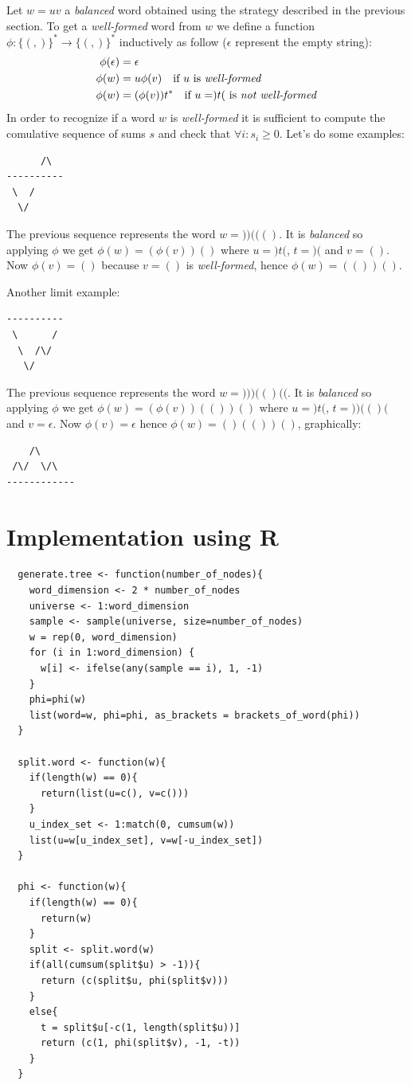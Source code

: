Let $w=uv$ a \emph{balanced} word obtained using the strategy described
in the previous section. To get a \emph{well-formed} word from $w$ we
define a function $\phi:\{(,)\}^*\rightarrow \{(,)\}^*$ inductively as
follow ($\epsilon$ represent the empty string):
\begin{displaymath}
  \begin{split}
    \phi(\epsilon) &= \epsilon \\
    \phi(w) &= u \phi(v) \quad \text{if } u \text{ is
      \emph{well-formed}}\\
    \phi(w) &= ( \phi(v) )t^* \quad \text{if } u=)t( \text{ is
      \emph{not well-formed}} 
  \end{split}
\end{displaymath}
In order to recognize if a word $w$ is \emph{well-formed} it is
sufficient to compute the comulative sequence of sums $s$ and check
that $\forall i:s_i \geq 0$. Let's do some examples:
\begin{verbatim}
      /\
----------
 \  /
  \/
\end{verbatim}
The previous sequence represents the word $w=))((()$. It is
\emph{balanced} so applying $\phi$ we get $\phi(w) = (\phi(v))()$
where $u=)t($, $t=)($ and $v=()$. Now $\phi(v) = ()$ because $v=()$ is
\emph{well-formed}, hence $\phi(w) = (())()$.

Another limit example:
\begin{verbatim}
----------
 \      /
  \  /\/
   \/
\end{verbatim}
The previous sequence represents the word $w=)))(()(($. It is
\emph{balanced} so applying $\phi$ we get $\phi(w) = (\phi(v))(())()$
where $u=)t($, $t=))(()($ and $v=\epsilon$. Now $\phi(v) =
\epsilon$ hence $\phi(w) = ()(())()$, graphically:
\begin{verbatim}
    /\
 /\/  \/\
------------
\end{verbatim}


\section{Implementation using R}

\begin{lstlisting}
  generate.tree <- function(number_of_nodes){
    word_dimension <- 2 * number_of_nodes    
    universe <- 1:word_dimension
    sample <- sample(universe, size=number_of_nodes)
    w = rep(0, word_dimension)
    for (i in 1:word_dimension) {
      w[i] <- ifelse(any(sample == i), 1, -1)
    }    
    phi=phi(w)
    list(word=w, phi=phi, as_brackets = brackets_of_word(phi))
  }

  split.word <- function(w){
    if(length(w) == 0){
      return(list(u=c(), v=c()))
    }    
    u_index_set <- 1:match(0, cumsum(w))
    list(u=w[u_index_set], v=w[-u_index_set])
  }

  phi <- function(w){
    if(length(w) == 0){
      return(w)
    }    
    split <- split.word(w)     
    if(all(cumsum(split$u) > -1)){
      return (c(split$u, phi(split$v)))
    }
    else{
      t = split$u[-c(1, length(split$u))]
      return (c(1, phi(split$v), -1, -t))
    }
  }
\end{lstlisting}

